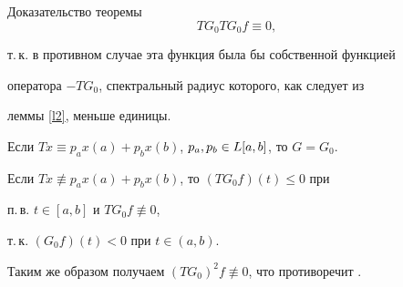 \begin{pf*}{Доказательство теоремы \protect{\ref{t1}}}
\begin{equation}\label{eqv}


TG_0TG_0f\equiv0,


\end{equation}


т.\,к. в противном случае эта функция была бы собственной функцией


оператора $-TG_0$, спектральный радиус которого, как следует из


леммы \ref{l2}, меньше единицы.





Если $Tx\equiv p_a x(a)+p_bx(b)$, $p_a,p_b\in L[a,b]$, то $G=G_0$.


Если $Tx\not\equiv p_a x(a)+p_bx(b)$, то $(TG_0f)(t){\le}0$ при


п.\,в. $t\in[a,b]$ и $TG_0f\not \equiv0$,


т.\,к. $(G_0f)(t)<0$ при $t\in(a,b)$.


Таким же образом получаем $(TG_0)^2f\not


\equiv0$, что противоречит .


\end{pf*}








